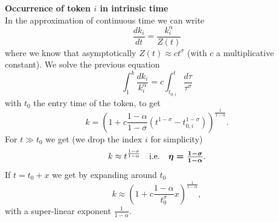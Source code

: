 \documentclass[draft,final]{vutinfth} %
\begin{document}
\vspace{1mm}\noindent\textbf{Occurrence of token $i$ in intrinsic time}\\
In the approximation of continuous time we can write
\begin{equation}
    \frac{dk_i}{dt} = \frac{k_i^\alpha}{Z(t)}
\end{equation}
where we know that asymptotically $Z(t)\approx c t^\sigma$ (with $c$ a multiplicative constant).
We solve the previous equation
\begin{equation}
    \int_1^k \frac{dk_i}{k_i^\alpha} = c \int_{t_{0,i}}^t \frac{d\tau}{\tau^\sigma}
\end{equation}
with $t_0$ the entry time of the token, to get
\begin{equation}
    k=\left(
        1+c\frac{1-\alpha}{1-\sigma}(t^{1-\sigma}-t_{0,i}^{1-\sigma})
    \right)^\frac{1}{1-\alpha}.
\end{equation}
For $t\gg t_0$ we get (we drop the index $i$ for simplicity)
\begin{equation}
    k\approx t^\frac{1-\sigma}{1-\alpha} ~~~ \mbox{i.e.} ~~~ 
    \mbox{\boldmath $\eta = \frac{1-\sigma}{1-\alpha}$}.
    \label{eq:eta}
\end{equation}
If $t=t_0+x$ we get by expanding around $t_0$
\begin{equation}
    k\approx \left(1+c\frac{1-\alpha}{t_0^\sigma}x
    \right)^\frac{1}{1-\alpha},
\end{equation}
with a super-linear exponent $\frac{1}{1-\alpha}$.
\end{document}
